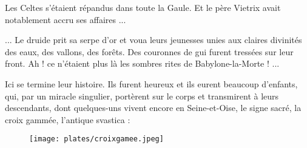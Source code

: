 \documentclass[a4paper, 11pt, oneside, polutonikogreek, french]{article}
\begin{document}
Les Celtes s'étaient répandus dans toute la Gaule. Et le père Vietrix avait notablement accru ses affaires ...

\bigskip
\centerline{\EightStarTaper}
\centerline{\EightStarTaper\EightStarTaper}
\bigskip

... Le druide prit sa serpe d'or et voua leurs jeunesses unies aux claires divinités des eaux, des vallons, des forêts. Des couronnes de gui furent tressées sur leur front. Ah ! ce n'étaient plus là les sombres rites de Babylone-la-Morte ! ...

\bigskip
\centerline{\EightStarTaper}
\centerline{\EightStarTaper\EightStarTaper}
\bigskip

Ici se termine leur histoire. Ils furent heureux et ils eurent beaucoup d'enfants, qui, par un miracle singulier, portèrent sur le corps et transmirent à leurs descendants, dont quelques-uns vivent encore en Seine-et-Oise, le signe sacré, la croix gammée, l'antique svastica :

\begin{figure}[H]
\centering
\texttt{[image: plates/croixgamee.jpeg]}
\end{figure}
\clearpage
\end{document}
